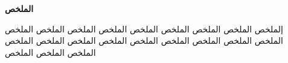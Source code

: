 \documentclass[sommairechap,stylejchiquet]{these_gi}
\begin{document}
\beforepreface
 

 
\tableofcontents
 
\listoffigures
\listoftables
\afterpreface
 
\adjustmtc

 \adjustmtc
  \adjustmtc
    
	
 
	
%
%
 

 
%   
% 


%

 

 

  
 



\begin{arabtex}
\begin{center}

\textbf{  الملخص    } 
\end{center}

إلملخص     الملخص     الملخص     الملخص     الملخص     الملخص     الملخص     الملخص     الملخص     الملخص     الملخص     الملخص     الملخص     الملخص     الملخص     الملخص     الملخص     الملخص     الملخص     الملخص     الملخص    

\end{arabtex}
\end{document}
